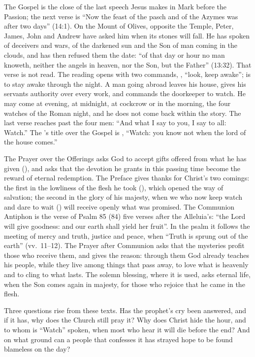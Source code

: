 The Gospel is the close of the last speech Jesus makes in Mark before the
Passion; the next verse is ``Now the feast of the pasch and of the Azymes was
after two days'' (14:1). On the Mount of Olives, opposite the Temple, Peter, James, John and
Andrew have asked him when its stones will fall. He has spoken of deceivers
and wars, of the darkened sun and the Son of man coming in the clouds, and has
then refused them the date: ``of that day or hour no man knoweth, neither the
angels in heaven, nor the Son, but the Father'' (13:32). That verse is not
read. The reading opens with two commands, , ``look,
keep awake'';  is to stay awake through the night. A man going abroad leaves his house, gives his servants
authority over every work, and commands the doorkeeper to watch. He may come
at evening, at midnight, at cockcrow or in the morning, the four watches of
the Roman night, and he does not come back within the story. The last verse
reaches past the four men: ``And what I say to you, I say to all: Watch.''
The 's title over the Gospel is , ``Watch: you know not when the lord of the house
comes.''

The Prayer over the Offerings asks God to accept gifts offered from what he
has given (), and asks that the
devotion he grants in this passing time become the reward of eternal
redemption. The Preface gives thanks for Christ's two comings: the first in
the lowliness of the flesh he took (),
which opened the way of salvation; the second in the glory of his majesty,
when we who now keep watch and dare to wait () will receive openly what was promised. The Communion Antiphon is
the verse of Psalm 85 (84) five verses after the Alleluia's: ``the Lord will
give goodness: and our earth shall yield her fruit''. In the psalm it follows
the meeting of mercy and truth, justice and peace, when ``Truth is sprung out
of the earth'' (vv.~11--12). The Prayer after
Communion asks that the mysteries profit those who receive them, and gives
the reason: through them God already teaches his people, while they live among
things that pass away, to love what is heavenly and to cling to what lasts.
The solemn blessing, where it is used, asks eternal life, when the Son comes
again in majesty, for those who rejoice that he came in the flesh.

Three questions rise from these texts. Has the prophet's cry been answered,
and if it has, why does the Church still pray it? Why does Christ hide the
hour, and to whom is ``Watch'' spoken, when most who hear it will die before
the end? And on what ground can a people that confesses it has strayed hope to
be found blameless on the day?
